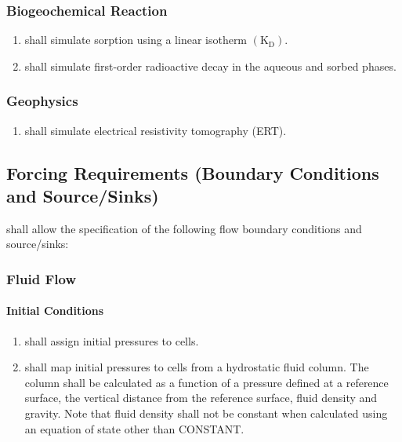 \subsubsection{Biogeochemical Reaction}
\begin{enumerate}[resume]
	\item \label{PCRxnKD} \pft shall simulate sorption using a linear isotherm $\left(\text{K}_\text{D}\right)$. 
	\item \label{PCRxnDecay} \pft shall simulate first-order radioactive decay in the aqueous and sorbed phases. 
\end{enumerate}
\subsubsection{Geophysics}
\begin{enumerate}[resume]
	\item \label{PCERT} \pft shall simulate electrical resistivity tomography (ERT). 
\end{enumerate}

\subsection{Forcing Requirements (Boundary Conditions and Source/Sinks)}
\pft shall allow the specification of the following flow boundary conditions and source/sinks:

\subsubsection{Fluid Flow}
\newcommand{\hydrostatictext}{ The column shall be calculated as a function of a pressure defined at a reference surface, the vertical distance from the reference surface, fluid density and gravity. Note that fluid density shall not be constant when calculated using an equation of state other than CONSTANT.}
\paragraph{Initial Conditions}
\begin{enumerate}
	\item \label{fluidDirichletIC} \pft shall assign initial pressures to cells. 
	\item \label{fluidHydrostaticIC} \pft shall map initial pressures to cells from a hydrostatic fluid column.
	\hydrostatictext
\end{enumerate}


